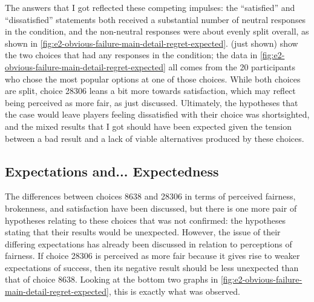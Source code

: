 The answers that I got reflected these competing impulses: the ``satisfied'' and ``dissatisfied'' statements both received a substantial number of neutral responses in the \obvfm{} condition, and the non-neutral responses were about evenly split overall, as shown in \cref{fig:e2-obvious-failure-main-detail-regret-expected}.
%
 (just shown) show the two choices that had any \casem{} responses in the \obvf{} condition; the data in \cref{fig:e2-obvious-failure-main-detail-regret-expected} all comes from the 20 participants who chose the most popular options at one of those choices.
%
While both choices are split, choice 28306 leans a bit more towards satisfaction, which may reflect being perceived as more fair, as just discussed.
%
Ultimately, the hypotheses that the \obvfm{} case would leave players feeling dissatisfied with their choice was shortsighted, and the mixed results that I got should have been expected given the tension between a bad result and a lack of viable alternatives produced by these choices.


\subsection{Expectations and... Expectedness}

The differences between choices 8638 and 28306 in terms of perceived fairness, brokenness, and satisfaction have been discussed, but there is one more pair of hypotheses relating to these choices that was not confirmed: the hypotheses stating that their results would be unexpected.
%
However, the issue of their differing expectations has already been discussed in relation to perceptions of fairness.
%
If choice 28306 is perceived as more fair because it gives rise to weaker expectations of success, then its negative result should be less unexpected than that of choice 8638.
%
Looking at the bottom two graphs in \cref{fig:e2-obvious-failure-main-detail-regret-expected}, this is exactly what was observed.

